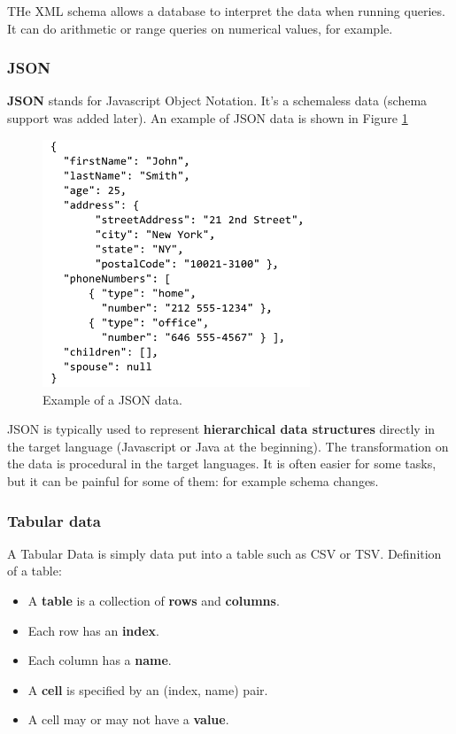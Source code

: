 THe XML schema allows a database to interpret the data when running queries. It can do arithmetic or range queries on numerical values, for example.

\subsubsection{JSON}

{\bf JSON} stands for Javascript Object Notation. It's a schemaless data (schema support was added later). An example of JSON data is shown in Figure \ref{pic:json}

\begin{figure}[H]%
 \centering
 \includegraphics[width=8cm]{./img/04/json}
 \caption{\label{pic:json} Example of a JSON data.}
\end{figure}

JSON is typically used to represent {\bf hierarchical data structures} directly in the target language (Javascript or Java at the beginning). The transformation on the data is procedural in the target languages. It is often easier for some tasks, but it can be painful for some of them: for example schema changes.

\subsubsection{Tabular data}

A Tabular Data is simply data put into a table such as CSV or TSV. Definition of a table:
\begin{itemize}
 \item A {\bf table} is a collection of {\bf rows} and {\bf columns}.
 \item Each row has an {\bf index}.
 \item Each column has a {\bf name}.
 \item A {\bf cell} is specified by an (index, name) pair.
 \item A cell may or may not have a {\bf value}.
\end{itemize}


